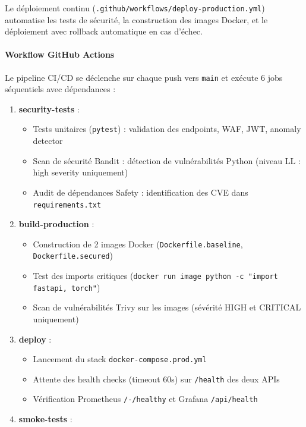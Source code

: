 Le déploiement continu (\texttt{.github/workflows/deploy-production.yml}) automatise les tests de sécurité, la construction des images Docker, et le déploiement avec rollback automatique en cas d'échec.

\paragraph{Workflow GitHub Actions}

Le pipeline CI/CD se déclenche sur chaque push vers \texttt{main} et exécute 6 jobs séquentiels avec dépendances :

\begin{enumerate}
    \item \textbf{security-tests} :
    \begin{itemize}
        \item Tests unitaires (\texttt{pytest}) : validation des endpoints, WAF, JWT, anomaly detector
        \item Scan de sécurité Bandit : détection de vulnérabilités Python (niveau LL : high severity uniquement)
        \item Audit de dépendances Safety : identification des CVE dans \texttt{requirements.txt}
    \end{itemize}
    \item \textbf{build-production} :
    \begin{itemize}
        \item Construction de 2 images Docker (\texttt{Dockerfile.baseline}, \texttt{Dockerfile.secured})
        \item Test des imports critiques (\texttt{docker run image python -c "import fastapi, torch"})
        \item Scan de vulnérabilités Trivy sur les images (sévérité HIGH et CRITICAL uniquement)
    \end{itemize}
    \item \textbf{deploy} :
    \begin{itemize}
        \item Lancement du stack \texttt{docker-compose.prod.yml}
        \item Attente des health checks (timeout 60s) sur \texttt{/health} des deux APIs
        \item Vérification Prometheus \texttt{/-/healthy} et Grafana \texttt{/api/health}
    \end{itemize}
    \item \textbf{smoke-tests} :
    \begin{itemize}

\end{itemize}
\end{enumerate}
